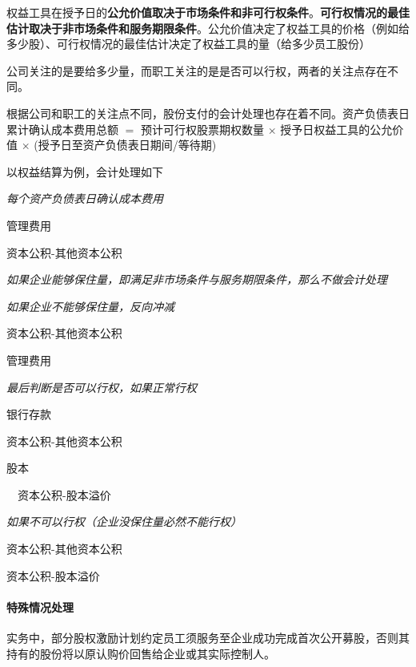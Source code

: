 \documentclass[UTF8,12pt]{ctexart}
\newenvironment{Dr}{%
	\begin{list}{}%
		{
			\setlength{\leftmargin}{2em}
			\setlength{\labelwidth}{2em}
			\setlength{\labelsep}{0pt}
			\setlength{\itemindent}{0pt}
			\setlength{\listparindent}{0pt}
			\setlength{\parsep}{0pt}
			\setlength{\topsep}{0pt}
		}
		\item[\textbf{借：}]
	}{%
	\end{list}
}
\newenvironment{Cr}{%
	\begin{list}{}%
		{
			\setlength{\leftmargin}{2em}
			\setlength{\labelwidth}{2em}
			\setlength{\labelsep}{0pt}
			\setlength{\itemindent}{0pt}
			\setlength{\listparindent}{0pt}
			\setlength{\parsep}{0pt}
			\setlength{\topsep}{0pt}
		}
		\item[\textbf{贷：}]
	}{%
	\end{list}
}
\numberwithin{equation}{section} %
\numberwithin{figure}{section}
\numberwithin{table}{section}
\begin{document}
	权益工具在授予日的\textbf{公允价值取决于市场条件和非可行权条件}。\textbf{可行权情况的最佳估计取决于非市场条件和服务期限条件}。公允价值决定了权益工具的价格（例如给多少股）、可行权情况的最佳估计决定了权益工具的量（给多少员工股份）
	
	公司关注的是要给多少量，而职工关注的是是否可以行权，两者的关注点存在不同。
	
	根据公司和职工的关注点不同，股份支付的会计处理也存在着不同。资产负债表日累计确认成本费用总额 $=$ 预计可行权股票期权数量 $\times$ 授予日权益工具的公允价值 $\times$ (授予日至资产负债表日期间/等待期)
	
	以权益结算为例，会计处理如下
	
	\textit{每个资产负债表日确认成本费用}
	
	\begin{Dr}
		管理费用
	\end{Dr}
	\begin{Cr}
		资本公积-其他资本公积
	\end{Cr}

	\textit{如果企业能够保住量，即满足非市场条件与服务期限条件，那么不做会计处理}
	
	\textit{如果企业不能够保住量，反向冲减}
	
	\begin{Dr}
		资本公积-其他资本公积
	\end{Dr}
	\begin{Cr}
		管理费用
	\end{Cr}

	\textit{最后判断是否可以行权，如果正常行权}
	
	\begin{Dr}
		银行存款
		
		资本公积-其他资本公积
	\end{Dr}
	\begin{Cr}
		股本
		
		\ \ 资本公积-股本溢价
	\end{Cr}

	\textit{如果不可以行权（企业没保住量必然不能行权）}
	
	\begin{Dr}
		资本公积-其他资本公积
	\end{Dr}
	\begin{Cr}
		资本公积-股本溢价
	\end{Cr}
	
	\paragraph{特殊情况处理}
	实务中，部分股权激励计划约定员工须服务至企业成功完成首次公开募股，否则其持有的股份将以原认购价回售给企业或其实际控制人。
	
\end{document}
